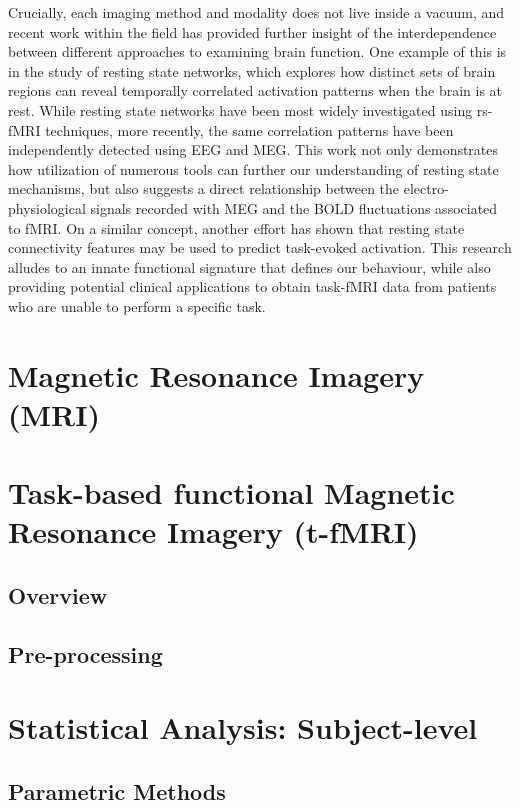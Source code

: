 Crucially, each imaging method and modality does not live inside a vacuum, and recent work within the field has provided further insight of the interdependence between different approaches to examining brain function. One example of this is in the study of resting state networks, which explores how distinct sets of brain regions can reveal temporally correlated activation patterns when the brain is at rest. While resting state networks have been most widely investigated using rs-fMRI techniques, more recently, the same correlation patterns have been independently detected using EEG and MEG. This work not only demonstrates how utilization of numerous tools can further our understanding of resting state mechanisms, but also suggests a direct relationship between the electro-physiological signals recorded with MEG and the BOLD fluctuations associated to fMRI. On a similar concept, another effort has shown that resting state connectivity features may be used to predict task-evoked activation. This research alludes to an innate functional signature that defines our behaviour, while also providing potential clinical applications to obtain task-fMRI data from patients who are unable to perform a specific task.  

\section{Magnetic Resonance Imagery (MRI)}

\section{Task-based functional Magnetic Resonance Imagery (t-fMRI)}

\subsection{Overview}

\subsection{Pre-processing}

\section{Statistical Analysis: Subject-level}

\subsection{Parametric Methods}

